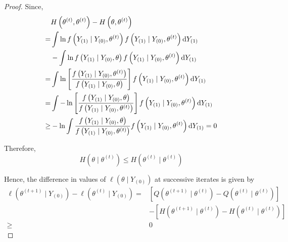 \begin{proof}
	Since,
	\begin{equation}
		\begin{aligned}
			     & H\left(\theta^{(t)},\theta^{(t)}\right)-H\left(\theta,\theta^{(t)}\right)                                                                                                      \\
			=    & \int\ln f\left(Y_{(1)}\mid Y_{(0)},\theta^{(t)}\right)f\left(Y_{(1)}\mid Y_{(0)},\theta^{(t)}\right)\mathop{}\!\mathrm{d} Y_{(1)}                                                               \\
			     & -\int\ln f\left(Y_{(1)}\mid Y_{(0)},\theta\right)f\left(Y_{(1)}\mid Y_{(0)},\theta^{(t)}\right)\mathop{}\!\mathrm{d} Y_{(1)}                                                                    \\
			=    & \int\ln\left[\frac{f\left(Y_{(1)}\mid Y_{(0)},\theta^{(t)}\right)}{f\left(Y_{(1)}\mid Y_{(0)},\theta\right)}\right]f\left(Y_{(1)}\mid Y_{(0)},\theta^{(t)}\right)\mathop{}\!\mathrm{d} Y_{(1)}  \\
			=    & \int-\ln\left[\frac{f\left(Y_{(1)}\mid Y_{(0)},\theta\right)}{f\left(Y_{(1)}\mid Y_{(0)},\theta^{(t)}\right)}\right]f\left(Y_{(1)}\mid Y_{(0)},\theta^{(t)}\right)\mathop{}\!\mathrm{d} Y_{(1)} \\
			\geq & -\ln\int\frac{f\left(Y_{(1)}\mid Y_{(0)},\theta\right)}{f\left(Y_{(1)}\mid Y_{(0)},\theta^{(t)}\right)}f\left(Y_{(1)}\mid Y_{(0)},\theta^{(t)}\right)\mathop{}\!\mathrm{d} Y_{(1)}=0
		\end{aligned}
	\end{equation}

	Therefore,
	\begin{equation}
		H\left(\theta \mid \theta^{(t)}\right) \leq H\left(\theta^{(t)} \mid \theta^{(t)}\right)
	\end{equation}

	Hence, the difference in values of \(\ell\left(\theta \mid Y_{(0)}\right)\) at successive iterates is given by
	\begin{equation}
		\begin{aligned}
			\ell\left(\theta^{(t+1)} \mid Y_{(0)}\right)-\ell\left(\theta^{(t)} \mid Y_{(0)}\right)= & \left[Q\left(\theta^{(t+1)} \mid \theta^{(t)}\right)-Q\left(\theta^{(t)} \mid \theta^{(t)}\right)\right]  \\
			                                                                                         & -\left[H\left(\theta^{(t+1)} \mid \theta^{(t)}\right)-H\left(\theta^{(t)} \mid \theta^{(t)}\right)\right] \\
			\geq                                                                                     & 0
		\end{aligned}
	\end{equation}
\end{proof}


